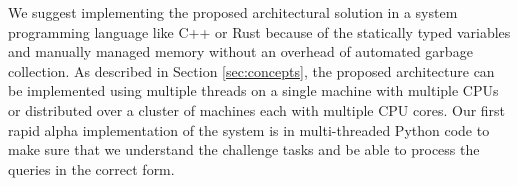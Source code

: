 We suggest implementing the proposed architectural solution in a system programming language like C++ or Rust because of the statically typed variables and manually managed memory without an overhead of automated garbage collection. As described in Section \ref{sec:concepts}, the proposed architecture can be implemented using multiple threads on a single machine with multiple CPUs or distributed over a cluster of machines each with multiple CPU cores.
Our first rapid alpha implementation of the system is in multi-threaded Python code to make sure that we understand the challenge tasks and be able to process the queries in the correct form.

